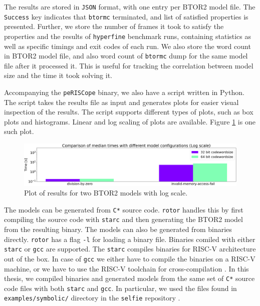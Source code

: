 \documentclass[12pt]{article}
\begin{document}
The results are stored in \texttt{JSON} format, with one entry per BTOR2 model
file. The \texttt{Success} key indicates that \texttt{btormc} terminated, and
list of satisfied properties is presented. Further, we store the number of
frames it took to satisfy the properties and the results of \texttt{hyperfine}
benchmark runs, containing statistics as well as specific timings and exit
codes of each run. We also store the word count in BTOR2 model file, and also
word count of \texttt{btormc} dump for the same model file after it processed
it. This is useful for tracking the correlation between model size and the time
it took solving it.

Accompanying the \texttt{peRISCope} binary, we also have a script written in
Python. The script takes the results file as input and generates plots for
easier visual inspection of the results. The script supports different types of
plots, such as box plots and histograms. Linear and log scaling of plots are
available. Figure \ref{fig:results_plot} is one such plot.

\begin{figure}
    \includegraphics[width=\linewidth]{assets/plot_example.png}
    \centering
    \caption{
        Plot of results for two BTOR2 models with log scale.
    }
    \label{fig:results_plot}
\end{figure}

The models can be generated from \texttt{C*} source code. \texttt{rotor}
handles this by first compiling the source code with \texttt{starc} and then
generating the BTOR2 model from the resulting binary. The models can also be
generated from binaries directly. \texttt{rotor} has a flag \texttt{-l} for
loading a binary file. Binaries comiled with either \texttt{starc} or
\texttt{gcc} are supported. The \texttt{starc} compiles binaries for RISC-V
architecture out of the box. In case of \texttt{gcc} we either have to compile
the binaries on a RISC-V machine, or we have to use the RISC-V toolchain for
cross-compilation \cite{riscv_gnu}. In this thesis, we compiled binaries and
generated models from the same set of \texttt{C*} source code files with both
\texttt{starc} and \texttt{gcc}. In particular, we used the files found in
\texttt{examples/symbolic/} directory in the \texttt{selfie} repository
\cite{gh:rotor}.
\end{document}
